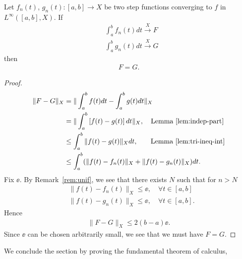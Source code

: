 %
\begin{lemma}[Independence]
  Let $f_{n}(t)$, $g_{n}(t) : [a,b] \to X$
  be two step functions converging to $f$ in $L^{\infty}([a,b], X)$.
  If
  \begin{equation*}
  \begin{split}
    & \int_{a}^{b} f_{n}(t) dt \xrightarrow{X} F
    \\
    & \int_{a}^{b} g_{n}(t) dt \xrightarrow{X} G
  \end{split}
  \end{equation*}
  then
  \begin{equation*}
  \begin{split}
    F =G.
  \end{split}
  \end{equation*}
\label{lem:well-def}
\end{lemma}
%
%
%
%
%
%
\begin{proof}
%
%
\begin{equation*}
\begin{split}
  \| F - G \|_{X} & = \| \int_{a}^{b} f(t) dt - \int_{a}^{b} g(t) dt \|_{X}
  \\
  & = \| \int_{a}^{b}\left[ f(t) - g(t) \right]dt \|_{X}, \quad \text{Lemma~\ref{lem:indep-part}}
  \\
  & \le \int_{a}^{b} \| f(t) - g(t) \|_{X} dt,
  \quad \phantom{m} \text{Lemma~\ref{lem:tri-ineq-int}}
  \\
  & \le \int_{a}^{b} (\| f(t) - f_{n}(t) \|_{X} + \| f(t) - g_{n}(t) \|_{X})dt.
\end{split}
\end{equation*}
%
%
Fix $\ee$. By Remark~\ref{rem:unif}, we see that there exists $N$ such
that for $n > N$
%
%
\begin{equation*}
\begin{split}
& \| f(t) - f_{n}(t) \|_{X} \le \ee, \quad \forall t \in [a, b]
\\
& \| f(t) - g_{n}(t) \|_{X} \le \ee, \quad \forall t \in [a, b].
\end{split}
\end{equation*}
%
%
Hence
%
%
\begin{equation*}
\begin{split}
\| F - G \|_{X} \le 2(b-a) \ee.
\end{split}
\end{equation*}
%
%
Since $\ee$ can be chosen arbitrarily small, we see that we must have $F = G$.
\end{proof}
%
%
We conclude the section by proving the fundamental theorem of calculus, 
